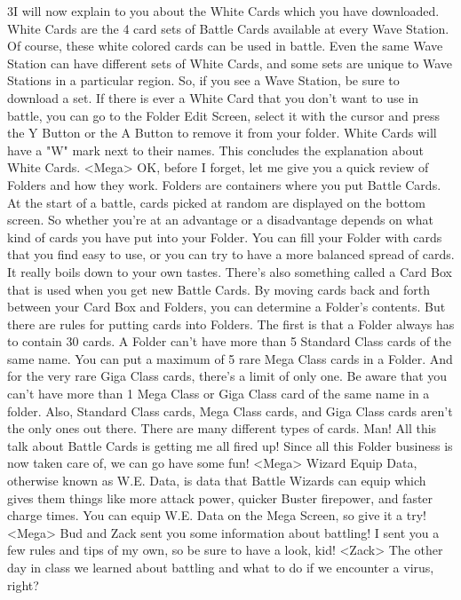 3I will now explain to you about the White Cards 
which you have downloaded. 
White Cards are the 4 card sets of 
Battle Cards available at every Wave Station. 
Of course, these white colored cards can be used in battle. 
Even the same Wave Station can have different sets of 
White Cards, and some sets are unique to 
Wave Stations in a particular region. 
So, if you see a Wave Station, be sure to download a set. 
If there is ever a White Card that you don't want to use in 
battle, you can go to the Folder Edit Screen, 
select it with the cursor and press the Y Button or the 
A Button to remove it from your folder. 
White Cards will have a "W" mark next to their names. 
This concludes the explanation about White Cards. 
<Mega> OK, before I forget, let me give you a 
quick review of Folders and how they work. 
Folders are containers where you put Battle Cards. 
At the start of a battle, cards picked at 
random are displayed on the bottom screen. 
So whether you're at an advantage or a disadvantage depends 
on what kind of cards you have put into your Folder. 
You can fill your Folder with cards that you find easy to use, 
or you can try to have a more balanced spread of cards. 
It really boils down to your own tastes. 
There's also something called a Card Box that 
is used when you get new Battle Cards. 
By moving cards back and forth between your Card Box and Folders, 
you can determine a Folder's contents. 
But there are rules for putting cards into Folders. 
The first is that a Folder always has to contain 30 cards. 
A Folder can't have more than 5 Standard Class cards of the same name. 
You can put a maximum of 5 rare Mega Class cards in a Folder. 
And for the very rare Giga Class cards, there's a limit of only one. 
Be aware that you can't have more than 1 Mega Class or Giga Class card of 
the same name in a folder. Also, Standard Class cards, 
Mega Class cards, and Giga Class cards aren't the only ones out there. 
There are many different types of cards. 
Man! All this talk about Battle Cards is getting me all fired up! 
Since all this Folder business is now taken care of, we can go have some fun! 
<Mega> Wizard Equip Data, otherwise known as W.E. Data, is data that 
Battle Wizards can equip which gives them things like more attack power, 
quicker Buster firepower, and faster charge times. 
You can equip W.E. Data on the Mega Screen, so give it a try! 
<Mega> Bud and Zack sent you some information about battling! 
I sent you a few rules and tips of my own, so be sure to have a look, kid! 
<Zack> The other day in class we learned about battling 
and what to do if we encounter a virus, right? 
